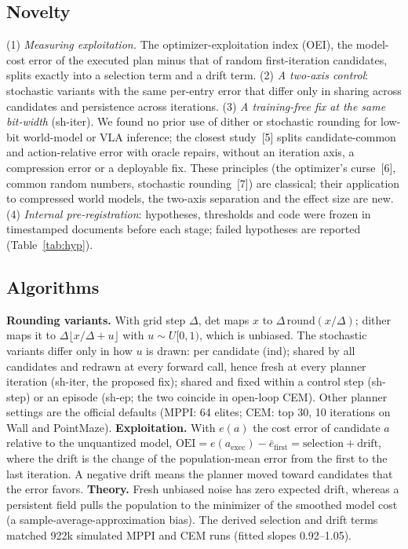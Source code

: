 \documentclass[nouppercase]{kaia}
\newcommand{\shiter}{\textsf{sh-iter}}
\newcommand{\dtm}{\textsf{det}}
\begin{document}
\begin{mdframed}
\subsection{Novelty}
(1) \textit{Measuring exploitation.} The optimizer-exploitation index (OEI), the model-cost error of the executed plan minus that of random first-iteration candidates, splits exactly into a selection term and a drift term. (2) \textit{A two-axis control}: stochastic variants with the same per-entry error that differ only in sharing across candidates and persistence across iterations. (3) \textit{A training-free fix at the same bit-width} (\shiter). We found no prior use of dither or stochastic rounding for low-bit world-model or VLA inference; the closest study~[5] splits candidate-common and action-relative error with oracle repairs, without an iteration axis, a compression error or a deployable fix. These principles (the optimizer's curse~[6], common random numbers, stochastic rounding~[7]) are classical; their application to compressed world models, the two-axis separation and the effect size are new. (4) \textit{Internal pre-registration}: hypotheses, thresholds and code were frozen in timestamped documents before each stage; failed hypotheses are reported (Table~\ref{tab:hyp}).

\subsection{Algorithms}
\textbf{Rounding variants.} With grid step $\Delta$, \dtm{} maps $x$ to $\Delta\,\mathrm{round}(x/\Delta)$; dither maps it to $\Delta\lfloor x/\Delta+u\rfloor$ with $u\sim U[0,1)$, which is unbiased. The stochastic variants differ only in how $u$ is drawn: per candidate (\textsf{ind}); shared by all candidates and redrawn at every forward call, hence fresh at every planner iteration (\shiter, the proposed fix); shared and fixed within a control step (\textsf{sh-step}) or an episode (\textsf{sh-ep}; the two coincide in open-loop CEM). Other planner settings are the official defaults (MPPI: 64 elites; CEM: top 30, 10 iterations on Wall and PointMaze).
\textbf{Exploitation.} With $e(a)$ the cost error of candidate $a$ relative to the unquantized model, $\mathrm{OEI}=e(a_{\mathrm{exec}})-\bar e_{\mathrm{first}}=\text{selection}+\text{drift}$, where the drift is the change of the population-mean error from the first to the last iteration. A negative drift means the planner moved toward candidates that the error favors.
\textbf{Theory.} Fresh unbiased noise has zero expected drift, whereas a persistent field pulls the population to the minimizer of the smoothed model cost (a sample-average-approximation bias). The derived selection and drift terms matched 922k simulated MPPI and CEM runs (fitted slopes 0.92--1.05).


\end{mdframed}
\end{document}
